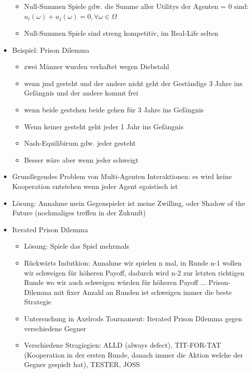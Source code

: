 \documentclass{article} %
\begin{document}
\begin{itemize}
\begin{itemize}
			\item Null-Summen Spiele gdw. die Summe aller Utilitys der Agenten = 0 sind: $u_i(\omega) + u_j(\omega) = 0, \forall \omega \in \Omega$
			\item Null-Summen Spiele sind streng kompetitiv, im Real-Life selten
		\end{itemize}
		\item Beispiel: Prison Dilemma
		\begin{itemize}
			\item zwei Männer wurden verhaftet wegen Diebstahl
			\item wenn jmd gesteht und der andere nicht geht der Geständige 3 Jahre ins Gefängnis und der andere kommt frei
			\item wenn beide gestehen beide gehen für 3 Jahre ins Gefängnis
			\item Wenn keiner gesteht geht jeder 1 Jahr ins Gefängnis
			\item Nash-Equilibirum gdw. jeder gesteht
			\item Besser wäre aber wenn jeder schweigt
		\end{itemize}
		\item Grundlegendes Problem von Multi-Agenten Interaktionen: es wird keine Kooperation entstehen wenn jeder Agent egoistisch ist
		\item Lösung: Annahme mein Gegenspieler ist meine Zwilling, oder Shadow of the Future (nochmaliges treffen in der Zukunft)
		\item Iterated Prison Dilemma
		\begin{itemize}
			\item Lösung: Spiele das Spiel mehrmals
			\item Rückwärts Indutkion: Annahme wir spielen n mal, in Runde n-1 wollen wir schweigen für höheren Payoff, dadurch wird n-2 zur letzten richtigen Runde wo wir auch schweigen würden für höheren Payoff $\dots$ Prison-Dilemma mit fixer Anzahl an Runden ist schweigen immer die beste Strategie
			\item Untersuchung in Axelrods Tournament: Iterated Prison Dilemma gegen verschiedene Gegner
			\item Verschiedene Stragiegien: ALLD (always defect), TIT-FOR-TAT (Kooperation in der ersten Runde, danach immer die Aktion welche der Gegner gespielt hat), TESTER, JOSS
		\end{itemize}
	\end{itemize}
\end{document}
